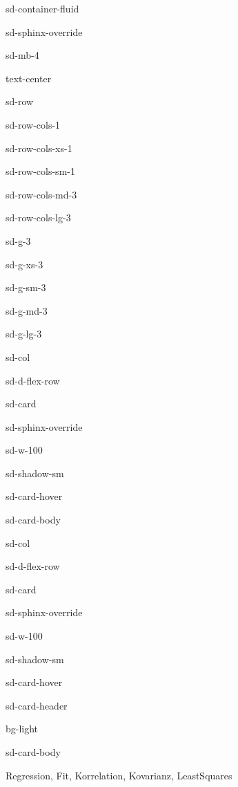 \documentclass[letterpaper,10pt,english]{jupyterBook}
\let\sphinxpxdimen\pdfpxdimen\else\newdimen\sphinxpxdimen
\begin{document}
\begin{sphinxuseclass}{sd-container-fluid}
\begin{sphinxuseclass}{sd-sphinx-override}
\begin{sphinxuseclass}{sd-mb-4}
\begin{sphinxuseclass}{text-center}
\begin{sphinxuseclass}{sd-row}
\begin{sphinxuseclass}{sd-row-cols-1}
\begin{sphinxuseclass}{sd-row-cols-xs-1}
\begin{sphinxuseclass}{sd-row-cols-sm-1}
\begin{sphinxuseclass}{sd-row-cols-md-3}
\begin{sphinxuseclass}{sd-row-cols-lg-3}
\begin{sphinxuseclass}{sd-g-3}
\begin{sphinxuseclass}{sd-g-xs-3}
\begin{sphinxuseclass}{sd-g-sm-3}
\begin{sphinxuseclass}{sd-g-md-3}
\begin{sphinxuseclass}{sd-g-lg-3}
\begin{sphinxuseclass}{sd-col}
\begin{sphinxuseclass}{sd-d-flex-row}
\begin{sphinxuseclass}{sd-card}
\begin{sphinxuseclass}{sd-sphinx-override}
\begin{sphinxuseclass}{sd-w-100}
\begin{sphinxuseclass}{sd-shadow-sm}
\begin{sphinxuseclass}{sd-card-hover}
\begin{sphinxuseclass}{sd-card-body}
\end{sphinxuseclass}{\hyperref[\detokenize{content/1_Messunsicherheiten::doc}]{}}
\end{sphinxuseclass}
\end{sphinxuseclass}
\end{sphinxuseclass}
\end{sphinxuseclass}
\end{sphinxuseclass}
\end{sphinxuseclass}
\end{sphinxuseclass}
\begin{sphinxuseclass}{sd-col}
\begin{sphinxuseclass}{sd-d-flex-row}
\begin{sphinxuseclass}{sd-card}
\begin{sphinxuseclass}{sd-sphinx-override}
\begin{sphinxuseclass}{sd-w-100}
\begin{sphinxuseclass}{sd-shadow-sm}
\begin{sphinxuseclass}{sd-card-hover}
\begin{sphinxuseclass}{sd-card-header}
\begin{sphinxuseclass}{bg-light}
\sphinxAtStartPar
{}

\end{sphinxuseclass}
\end{sphinxuseclass}
\begin{sphinxuseclass}{sd-card-body}
\noindent\sphinxincludegraphics[height=120\sphinxpxdimen]{{kleinste_quadrate}.png}

\sphinxAtStartPar
Regression, Fit, Korrelation, Kovarianz, Least\sphinxhyphen{}Squares


\end{sphinxuseclass}
\end{sphinxuseclass}
\end{sphinxuseclass}
\end{sphinxuseclass}
\end{sphinxuseclass}
\end{sphinxuseclass}
\end{sphinxuseclass}
\end{sphinxuseclass}
\end{sphinxuseclass}
\end{sphinxuseclass}
\end{sphinxuseclass}
\end{sphinxuseclass}
\end{sphinxuseclass}
\end{sphinxuseclass}
\end{sphinxuseclass}
\end{sphinxuseclass}
\end{sphinxuseclass}
\end{sphinxuseclass}
\end{sphinxuseclass}
\end{sphinxuseclass}
\end{sphinxuseclass}
\end{sphinxuseclass}
\end{sphinxuseclass}
\end{document}
